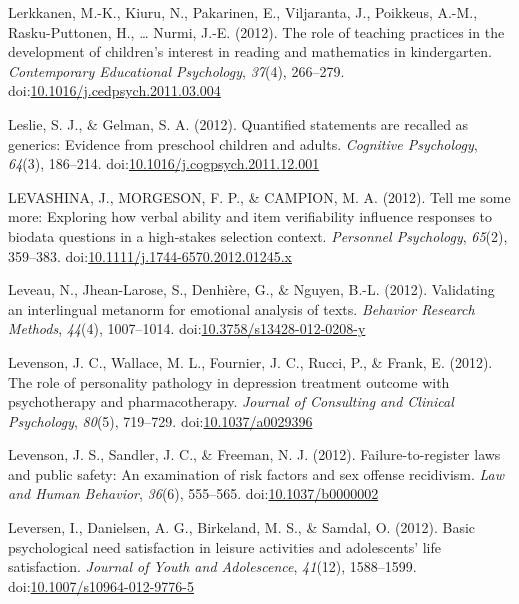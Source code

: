 \documentclass[english,man]{apa6}
\theoremstyle{definition}
\theoremstyle{definition}
\theoremstyle{definition}
\theoremstyle{remark}
\begin{document}
\hypertarget{ref-Lerkkanen2012}{}
Lerkkanen, M.-K., Kiuru, N., Pakarinen, E., Viljaranta, J., Poikkeus,
A.-M., Rasku-Puttonen, H., \ldots{} Nurmi, J.-E. (2012). The role of
teaching practices in the development of children's interest in reading
and mathematics in kindergarten. \emph{Contemporary Educational
Psychology}, \emph{37}(4), 266--279.
doi:\href{https://doi.org/10.1016/j.cedpsych.2011.03.004}{10.1016/j.cedpsych.2011.03.004}

\hypertarget{ref-Leslie2012}{}
Leslie, S. J., \& Gelman, S. A. (2012). Quantified statements are
recalled as generics: Evidence from preschool children and adults.
\emph{Cognitive Psychology}, \emph{64}(3), 186--214.
doi:\href{https://doi.org/10.1016/j.cogpsych.2011.12.001}{10.1016/j.cogpsych.2011.12.001}

\hypertarget{ref-Levashina2012}{}
LEVASHINA, J., MORGESON, F. P., \& CAMPION, M. A. (2012). Tell me some
more: Exploring how verbal ability and item verifiability influence
responses to biodata questions in a high-stakes selection context.
\emph{Personnel Psychology}, \emph{65}(2), 359--383.
doi:\href{https://doi.org/10.1111/j.1744-6570.2012.01245.x}{10.1111/j.1744-6570.2012.01245.x}

\hypertarget{ref-Leveau2012}{}
Leveau, N., Jhean-Larose, S., Denhière, G., \& Nguyen, B.-L. (2012).
Validating an interlingual metanorm for emotional analysis of texts.
\emph{Behavior Research Methods}, \emph{44}(4), 1007--1014.
doi:\href{https://doi.org/10.3758/s13428-012-0208-y}{10.3758/s13428-012-0208-y}

\hypertarget{ref-Levenson2012}{}
Levenson, J. C., Wallace, M. L., Fournier, J. C., Rucci, P., \& Frank,
E. (2012). The role of personality pathology in depression treatment
outcome with psychotherapy and pharmacotherapy. \emph{Journal of
Consulting and Clinical Psychology}, \emph{80}(5), 719--729.
doi:\href{https://doi.org/10.1037/a0029396}{10.1037/a0029396}

\hypertarget{ref-Levenson2012a}{}
Levenson, J. S., Sandler, J. C., \& Freeman, N. J. (2012).
Failure-to-register laws and public safety: An examination of risk
factors and sex offense recidivism. \emph{Law and Human Behavior},
\emph{36}(6), 555--565.
doi:\href{https://doi.org/10.1037/b0000002}{10.1037/b0000002}

\hypertarget{ref-Leversen2012}{}
Leversen, I., Danielsen, A. G., Birkeland, M. S., \& Samdal, O. (2012).
Basic psychological need satisfaction in leisure activities and
adolescents' life satisfaction. \emph{Journal of Youth and Adolescence},
\emph{41}(12), 1588--1599.
doi:\href{https://doi.org/10.1007/s10964-012-9776-5}{10.1007/s10964-012-9776-5}
\end{document}
